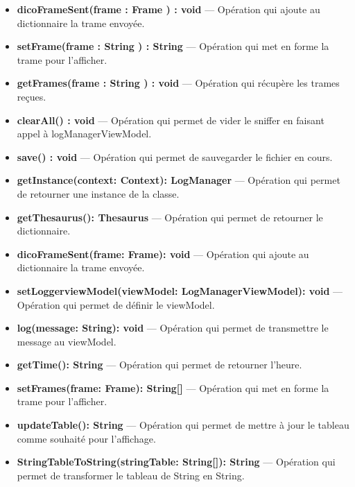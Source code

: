\begin{itemize}
    \item \textbf{dicoFrameSent(frame : Frame ) : void} --- Opération qui ajoute au dictionnaire la trame envoyée. 
    \item \textbf{setFrame(frame : String ) : String } --- Opération qui met en forme la trame pour l'afficher.
    \item \textbf{getFrames(frame : String ) : void } --- Opération qui récupère les trames reçues. 
    \item \textbf{clearAll() : void } --- Opération qui permet de vider le sniffer en faisant appel à logManagerViewModel. 
    \item \textbf{save() : void } --- Opération qui permet de sauvegarder le fichier en cours.  
    \item \textbf{getInstance(context: Context): LogManager} --- Opération qui permet de retourner une instance de la classe. 
    \item \textbf{getThesaurus(): Thesaurus} --- Opération qui permet de retourner le dictionnaire. 
    \item \textbf{dicoFrameSent(frame: Frame): void} --- Opération qui ajoute au dictionnaire la trame envoyée. 
    \item \textbf{setLoggerviewModel(viewModel: LogManagerViewModel): void} --- Opération qui permet de définir le viewModel. 
    \item \textbf{log(message: String): void} --- Opération qui permet de transmettre le message au viewModel. 
    \item \textbf{getTime(): String} --- Opération qui permet de retourner l'heure. 
    \item \textbf{setFrames(frame: Frame): String[]} --- Opération qui met en forme la trame pour l'afficher. 
    \item \textbf{updateTable(): String} --- Opération qui permet de mettre à jour le tableau comme souhaité pour l'affichage. 
    \item \textbf{StringTableToString(stringTable: String[]): String} --- Opération qui permet de transformer le tableau de String en String.
\end{itemize}